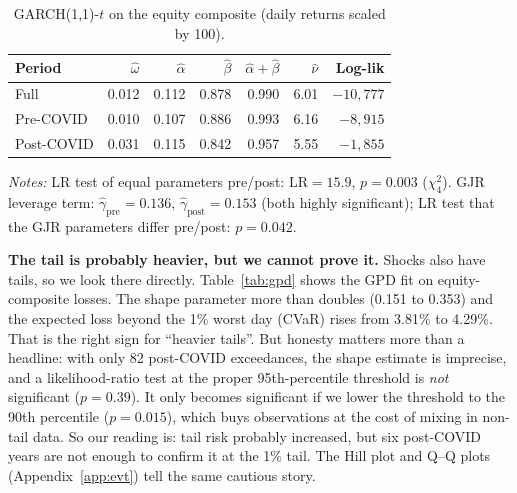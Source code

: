 \documentclass[11pt,a4paper]{article}
\begin{document}
\begin{table}[H]
\centering
\caption{GARCH(1,1)-$t$ on the equity composite (daily returns scaled by 100).}
\label{tab:garch}
\small
\begin{tabular}{lrrrrrr}
\toprule
Period & $\hat\omega$ & $\hat\alpha$ & $\hat\beta$ & $\hat\alpha+\hat\beta$ & $\hat\nu$ & Log-lik \\
\midrule
Full        & 0.012 & 0.112 & 0.878 & 0.990 & 6.01 & $-10{,}777$ \\
Pre-COVID   & 0.010 & 0.107 & 0.886 & 0.993 & 6.16 & $-8{,}915$ \\
Post-COVID  & 0.031 & 0.115 & 0.842 & 0.957 & 5.55 & $-1{,}855$ \\
\bottomrule
\end{tabular}
\begin{flushleft}
\footnotesize
\textit{Notes:} LR test of equal parameters pre/post: $\text{LR}=15.9$, $p=0.003$ ($\chi^2_4$). GJR
leverage term: $\hat\gamma_{\text{pre}}=0.136$, $\hat\gamma_{\text{post}}=0.153$ (both highly
significant); LR test that the GJR parameters differ pre/post: $p=0.042$.
\end{flushleft}
\end{table}

\textbf{The tail is probably heavier, but we cannot prove it.} Shocks also have tails, so we look there
directly. Table~\ref{tab:gpd} shows the GPD fit on equity-composite losses. The shape parameter more than
doubles (0.151 to 0.353) and the expected loss beyond the 1\% worst day (CVaR) rises from 3.81\% to
4.29\%. That is the right sign for ``heavier tails''. But honesty matters more than a headline: with only
82 post-COVID exceedances, the shape estimate is imprecise, and a likelihood-ratio test at the proper
95th-percentile threshold is \emph{not} significant ($p=0.39$). It only becomes significant if we lower
the threshold to the 90th percentile ($p=0.015$), which buys observations at the cost of mixing in
non-tail data. So our reading is: tail risk probably increased, but six post-COVID years are not enough to
confirm it at the 1\% tail. The Hill plot and Q--Q plots (Appendix~\ref{app:evt}) tell the same cautious
story.
\end{document}
